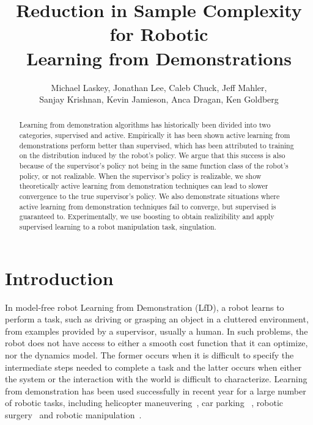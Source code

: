 \documentclass[10pt, conference]{ieeeconf}      %
\title{Reduction in Sample Complexity for Robotic\\
 Learning from Demonstrations}
\author{Michael Laskey, Jonathan Lee, Caleb Chuck, Jeff Mahler,\\ Sanjay Krishnan, Kevin Jamieson, Anca Dragan, Ken Goldberg}
\begin{document}
\maketitle
\thispagestyle{empty}
\pagestyle{empty}







\begin{abstract}
Learning from demonstration algorithms has historically been divided into two categories, supervised and active. Empirically it has been shown active learning from demonstrations perform better than supervised, which has been attributed to training on the distribution induced by the robot's policy. We argue that this success is also because of the supervisor's policy not being in the same function class of the robot's policy, or not realizable. When the supervisor's policy is realizable, we show theoretically active learning from demonstration techniques can lead to slower convergence to the true supervisor's policy. We also demonstrate situations where active learning from demonstration techniques fail to converge, but supervised is guaranteed to. Experimentally, we use boosting to obtain realizibility and apply supervised learning to a  robot manipulation task, singulation. 

 \end{abstract}


\section{Introduction} 
In model-free robot Learning from Demonstration (LfD), a robot learns to perform a task, such as driving or grasping an object in a cluttered environment, from examples provided by a  supervisor, usually a human.  In such problems, the robot does not have access to either a smooth cost function that it can optimize, nor the dynamics model. The former occurs when it is difficult to specify the intermediate steps needed to complete a task and the latter occurs when either the system or the interaction with the world is difficult to characterize. Learning from demonstration has been used successfully in recent year for a large number of robotic tasks, including helicopter maneuvering~\cite{abbeel2007application}, car parking~\cite{abbeel2008apprenticeship} , robotic surgery~\cite{van2010superhuman,laskeyshiv} and robotic manipulation~\cite{laskeyrobot}.
\end{document}
